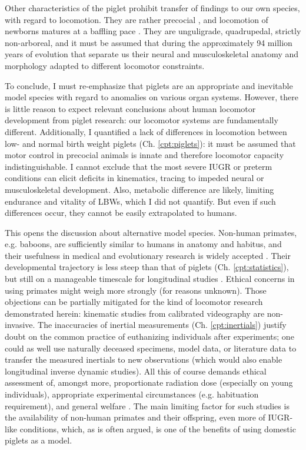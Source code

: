 Other characteristics of the piglet prohibit transfer of findings to our own species, with regard to locomotion.
They are rather precocial \citep{Wischner2009,JYoung2023}, and locomotion of newborns matures at a baffling pace \citep{VandenHole2017,VandenHole2018}.
They are unguligrade, quadrupedal, strictly non-arboreal, and it must be assumed that during the approximately 94 million years of evolution that separate us \citep{Timetree2017} their neural and musculoskeletal anatomy and morphology adapted to different locomotor constraints.


To conclude, I must re-emphasize that piglets are an appropriate and inevitable model species with regard to anomalies on various organ systems.
However, there is little reason to expect relevant conclusions about human locomotor development from piglet research: our locomotor systems are fundamentally different.
Additionally, I quantified a lack of differences in locomotion between low- and normal birth weight piglets (Ch. \ref{cpt:piglets}): it must be assumed that motor control in precocial animals is innate and therefore locomotor capacity indistinguishable.
I cannot exclude that the most severe IUGR or preterm conditions can elicit deficits in kinematics, tracing to impeded neural or musculoskeletal development.
Also, metabolic difference are likely, limiting endurance and vitality of LBWs, which I did not quantify.
But even if such differences occur, they cannot be easily extrapolated to humans.


This opens the discussion about alternative model species.
Non-human primates, e.g. baboons, are sufficiently similar to humans in anatomy and habitus, and their usefulness in medical and evolutionary research is widely accepted \citep{Nardone2017,Liang2023,Aerts2023b,Druelle2021,BoulinguezAmbroise2021}.
Their developmental trajectory is less steep than that of piglets (Ch. \ref{cpt:statistics}), but still on a manageable timescale for longitudinal studies \citep{Druelle2017}.
Ethical concerns in using primates might weigh more strongly (for reasons unknown).
Those objections can be partially mitigated for the kind of locomotor research demonstrated herein:
kinematic studies from calibrated videography are non-invasive.
The inaccuracies of inertial measurements (Ch. \ref{cpt:inertials}) justify doubt on the common practice of euthanizing individuals after experiments; one could as well use naturally deceased specimens, model data, or literature data to transfer the measured inertials to new observations (which would also enable longitudinal inverse dynamic studies).
All this of course demands ethical assessment of, amongst more, proportionate radiation dose (especially on young individuals), appropriate experimental circumstances (e.g. habituation requirement), and general welfare \citep{Young2018}.
The main limiting factor for such studies is the availability of non-human primates and their offspring, even more of IUGR-like conditions, which, as is often argued, is one of the benefits of using domestic piglets as a model.

